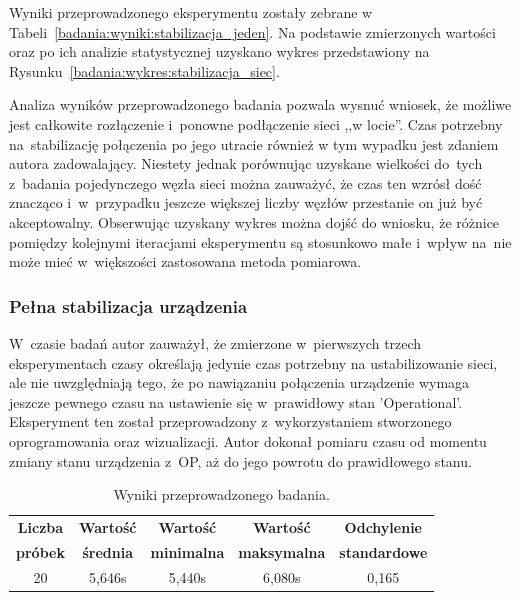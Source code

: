 \noindent Wyniki przeprowadzonego eksperymentu zostały zebrane w Tabeli~\ref{badania:wyniki:stabilizacja_jeden}. Na podstawie zmierzonych wartości oraz po ich analizie statystycznej uzyskano wykres przedstawiony na Rysunku~\ref{badania:wykres:stabilizacja_siec}.


Analiza wyników przeprowadzonego badania pozwala wysnuć wniosek, że możliwe jest całkowite rozłączenie i~ponowne podłączenie sieci ,,w locie''. Czas potrzebny na~stabilizację połączenia po jego utracie również w tym wypadku jest zdaniem autora zadowalający. Niestety jednak porównując uzyskane wielkości do~tych z~badania pojedynczego węzła sieci można zauważyć, że czas ten wzrósł dość znacząco i~w~przypadku jeszcze większej liczby węzłów przestanie on już być akceptowalny. Obserwując uzyskany wykres można dojść do wniosku, że różnice pomiędzy kolejnymi iteracjami eksperymentu są stosunkowo małe i~wpływ na~nie może mieć w~większości zastosowana metoda pomiarowa.

\subsubsection{Pełna stabilizacja urządzenia}
W~czasie badań autor zauważył, że zmierzone w~pierwszych trzech eksperymentach czasy określają jedynie czas potrzebny na ustabilizowanie sieci, ale nie uwzględniają tego, że po nawiązaniu połączenia urządzenie wymaga jeszcze pewnego czasu na ustawienie się w~prawidłowy stan 'Operational'. Eksperyment ten został przeprowadzony z~wykorzystaniem stworzonego oprogramowania oraz wizualizacji. Autor dokonał pomiaru czasu od momentu zmiany stanu urządzenia z~OP, aż do jego powrotu do prawidłowego stanu.

\begin{table}[!htb]
\begin{center}
\begin{tabular}{| c | c | c | c | c |}\hline
\textbf{Liczba} & \textbf{Wartość} & \textbf{Wartość} & \textbf{Wartość} & \textbf{Odchylenie} \\
\textbf{próbek} & \textbf{średnia} & \textbf{minimalna} & \textbf{maksymalna} & \textbf{standardowe} \\\hline\hline
20 & 5,646s & 5,440s & 6,080s & 0,165\\\hline
\end{tabular}
\end{center}
\vspace*{-6mm}
  \caption{Wyniki przeprowadzonego badania.}
	\label{badania:wyniki:op_jeden}
\end{table}

